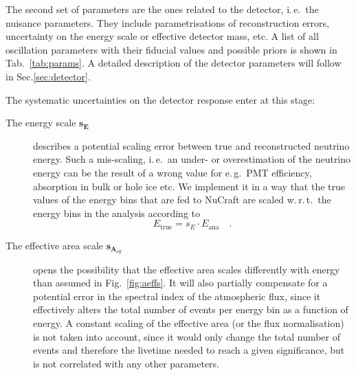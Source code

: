 The second set of parameters are the ones related to the detector, i.\,e.\ the
nuisance parameters. They include parametrisations of reconstruction errors,
uncertainty on the energy scale or effective detector mass, etc.  A list of all
oscillation parameters with their fiducial values and possible priors is shown
in Tab.~\ref{tab:params}. A detailed description of the detector parameters
will follow in Sec.\ref{sec:detector}.



The systematic uncertainties on the detector response enter at this stage:
\begin{description}
 \item[The energy scale $\mathbf{s_E}$] describes a potential scaling error
  between true and reconstructed neutrino energy. Such a mis-scaling, i.\,e.\
  an under- or overestimation of the neutrino energy can be the result of a
  wrong value for e.\,g.\ PMT efficiency, absorption in bulk or hole ice etc.
  We implement it in a way that the true values of the energy bins that are fed
  to NuCraft are scaled w.\,r.\,t.\ the energy bins in the analysis according to
  \begin{equation}
   E_\mathrm{true} = s_E\cdot E_\mathrm{ana}\quad.
  \end{equation}

%

 \item[The effective area scale $\mathbf{s_{A_\mathrm{eff}}}$] opens the
  possibility that the effective area scales differently with energy than
  assumed in Fig.~\ref{fig:aeffs}. It will also partially compensate for a
  potential error in the spectral index of the atmospheric flux, since it
  effectively alters the total number of events per energy bin as a function of
  energy. A constant scaling of the effective area (or the flux normalisation)
  is not taken into account, since it would only change the total number of
  events and therefore the livetime needed to reach a given significance, but is
  not correlated with any other parameters.


\end{description}
